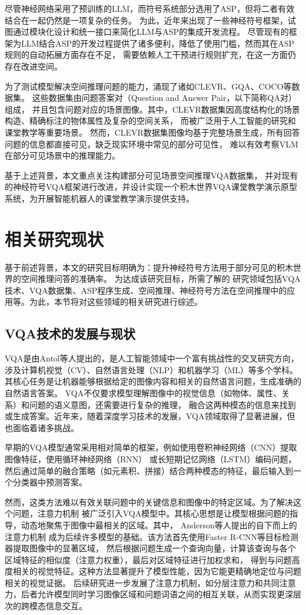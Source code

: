 尽管神经网络采用了预训练的LLM，而符号系统部分选用了ASP，但将二者有效结合在一起仍然是一项复杂的任务。
为此，近年来出现了一些神经符号框架，试图通过模块化设计和统一接口来简化LLM与ASP的集成开发流程\cite{wang2024dspybasedneuralsymbolicpipelineenhance}。
尽管现有的框架为LLM结合ASP的开发过程提供了诸多便利，降低了使用门槛，然而其在ASP规则的自动拓展方面存在不足，
需要依赖人工干预进行规则扩充，在这一方面仍存在改进空间。

为了测试模型解决空间推理问题的能力，涌现了诸如CLEVR、GQA、COCO等数据集。
这些数据集由问题答案对（Question and Answer Pair，以下简称QA对）组成，
并且包含问题对应的场景图像。其中，CLEVR数据集因高度结构化的场景构造、精确标注的物体属性及复杂的空间关系，
而被广泛用于人工智能的研究和课堂教学等重要场景。
然而，CLEVR数据集图像均基于完整场景生成，所有回答问题的信息都直接可见，缺乏现实环境中常见的部分可见性，
难以有效考察VLM在部分可见场景中的推理能力\cite{sam-abraham-etal-2024-clevr}。

基于上述背景，本文重点关注构建部分可见场景空间推理VQA数据集，
并对现有的神经符号VQA框架进行改进，并设计实现一个积木世界VQA课堂教学演示原型系统，为开展智能机器人的课堂教学演示提供支持。
\section{相关研究现状}
基于前述背景，本文的研究目标明确为：提升神经符号方法用于部分可见的积木世界的空间推理问答的准确率。
为达成该研究目标，所需了解的
研究领域包括VQA技术、VQA数据集、ASP程序生成、空间推理、神经符号方法在空间推理中的应用等。为此，本节将对这些领域的相关研究进行综述。
\subsection{VQA技术的发展与现状}
VQA是由Antol等人\cite{Antol2015VQA}提出的，是人工智能领域中一个富有挑战性的交叉研究方向，
涉及计算机视觉（CV）、自然语言处理（NLP）和机器学习（ML）等多个学科。
其核心任务是让机器能够根据给定的图像内容和相关的自然语言问题，生成准确的自然语言答案。
VQA不仅要求模型理解图像中的视觉信息（如物体、属性、关系）和问题的语义意图，还需要进行复杂的推理，
融合这两种模态的信息来找到或生成答案。近年来，随着深度学习技术的发展，VQA领域取得了显著进展，但也面临着诸多挑战。

早期的VQA模型通常采用相对简单的框架，例如使用卷积神经网络（CNN）提取图像特征，使用循环神经网络（RNN）
或长短期记忆网络（LSTM）编码问题，然后通过简单的融合策略（如元素积、拼接）结合两种模态的特征，最后输入到一个分类器中预测答案。

然而，这类方法难以有效关联问题中的关键信息和图像中的特定区域。为了解决这个问题，注意力机制
被广泛引入VQA模型中。其核心思想是让模型根据问题的指导，动态地聚焦于图像中最相关的区域。其中， Anderson等人提出的自下而上的注意力机制\cite{anderson2018bottom}
成为后续许多模型的基础。该方法首先使用Faster R-CNN等目标检测器提取图像中的显著区域，
然后根据问题生成一个查询向量，计算该查询与各个区域特征的相似度（注意力权重），最后对区域特征进行加权求和，
得到与问题高度相关的视觉特征。这种方法显著提升了模型性能，因为它能更精确地定位与问题相关的视觉证据。
后续研究进一步发展了注意力机制，如分层注意力\cite{lu2016hierarchical}和共同注意力，后者允许模型同时学习图像区域和问题词语之间的相互关联，从而实现更深层次的跨模态信息交互。

